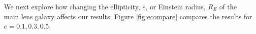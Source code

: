 We next explore how changing the ellipticity, $e$, or Einstein radius, $R_E$ of the main lens galaxy affects our results. Figure \ref{fig:ecompare} compares the results for $e=0.1, 0.3, 0.5$.